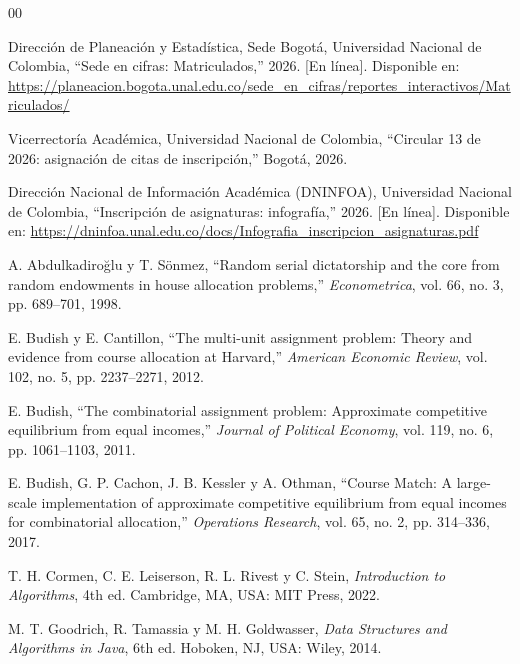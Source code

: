 \documentclass[conference]{IEEEtran}
\begin{document}
\begin{thebibliography}{00}

Dirección de Planeación y Estadística, Sede Bogotá, Universidad Nacional de Colombia,
``Sede en cifras: Matriculados,'' 2026.
[En línea]. Disponible en: \url{https://planeacion.bogota.unal.edu.co/sede_en_cifras/reportes_interactivos/Matriculados/}

Vicerrectoría Académica, Universidad Nacional de Colombia,
``Circular 13 de 2026: asignación de citas de inscripción,'' Bogotá, 2026.

Dirección Nacional de Información Académica (DNINFOA), Universidad Nacional de Colombia,
``Inscripción de asignaturas: infografía,'' 2026.
[En línea]. Disponible en: \url{https://dninfoa.unal.edu.co/docs/Infografia_inscripcion_asignaturas.pdf}

A. Abdulkadiroğlu y T. Sönmez,
``Random serial dictatorship and the core from random endowments in house allocation problems,''
\textit{Econometrica}, vol. 66, no. 3, pp. 689--701, 1998.

E. Budish y E. Cantillon,
``The multi-unit assignment problem: Theory and evidence from course allocation at Harvard,''
\textit{American Economic Review}, vol. 102, no. 5, pp. 2237--2271, 2012.

E. Budish,
``The combinatorial assignment problem: Approximate competitive equilibrium from equal incomes,''
\textit{Journal of Political Economy}, vol. 119, no. 6, pp. 1061--1103, 2011.

E. Budish, G. P. Cachon, J. B. Kessler y A. Othman,
``Course Match: A large-scale implementation of approximate competitive equilibrium from equal incomes for combinatorial allocation,''
\textit{Operations Research}, vol. 65, no. 2, pp. 314--336, 2017.

T. H. Cormen, C. E. Leiserson, R. L. Rivest y C. Stein,
\textit{Introduction to Algorithms}, 4th ed.
Cambridge, MA, USA: MIT Press, 2022.

M. T. Goodrich, R. Tamassia y M. H. Goldwasser,
\textit{Data Structures and Algorithms in Java}, 6th ed.
Hoboken, NJ, USA: Wiley, 2014.

\end{thebibliography}
\end{document}
